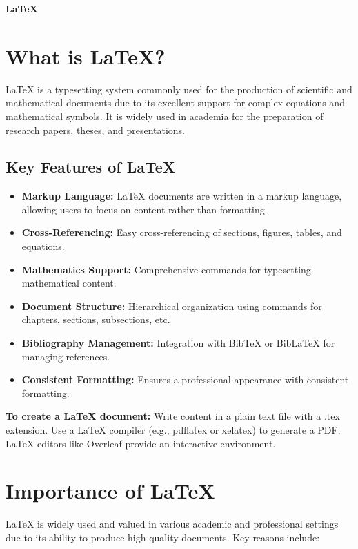 \documentclass[11pt]{article}
\begin{document}
   
\vspace*{10em}
\begin{center}
\Huge\bfseries\color{myblue}
\textbf{\LaTeX}
\end{center}
\vspace{2em}

\section{\LARGE What is \LaTeX?}
LaTeX is a typesetting system commonly used for the production of scientific and mathematical documents due to its excellent support for complex equations and mathematical symbols. It is widely used in academia for the preparation of research papers, theses, and presentations.

\subsection{\Large Key Features of \LaTeX}
\begin{itemize}
  \item \textbf{Markup Language:} LaTeX documents are written in a markup language, allowing users to focus on content rather than formatting.
  
  \item \textbf{Cross-Referencing:} Easy cross-referencing of sections, figures, tables, and equations.
  
  \item \textbf{Mathematics Support:} Comprehensive commands for typesetting mathematical content.
  
  \item \textbf{Document Structure:} Hierarchical organization using commands for chapters, sections, subsections, etc.
  
  \item \textbf{Bibliography Management:} Integration with BibTeX or BibLaTeX for managing references.
  
  \item \textbf{Consistent Formatting:} Ensures a professional appearance with consistent formatting.
\end{itemize}

\textcolor{myblue}{\textbf{To create a LaTeX document:}} Write content in a plain text file with a .tex extension. Use a LaTeX compiler (e.g., pdflatex or xelatex) to generate a PDF. LaTeX editors like Overleaf provide an interactive environment.


\section{\LARGE Importance of \LaTeX}
LaTeX is widely used and valued in various academic and professional settings due to its ability to produce high-quality documents. Key reasons include:
\end{document}

